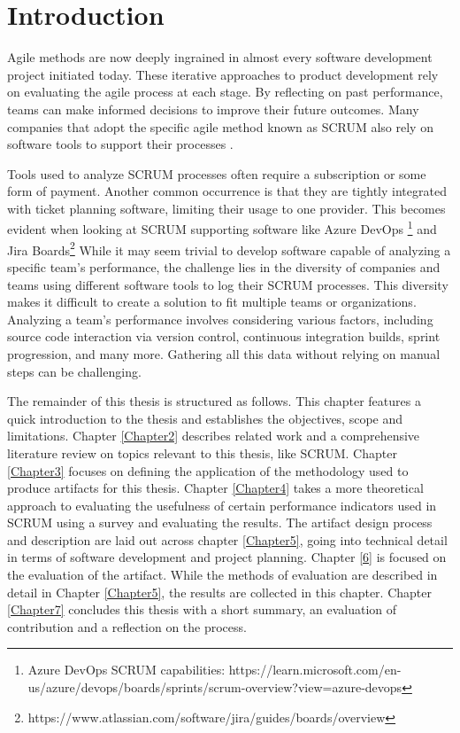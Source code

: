 \chapter{Introduction}
\label{Chapter1}

Agile methods are now deeply ingrained in almost every software development project initiated today.
These iterative approaches to product development rely on evaluating the agile 
process at each stage. By reflecting on past performance, 
teams can make informed decisions to improve their future outcomes. 
Many companies that adopt the specific agile method known as SCRUM also 
rely on software tools to support their processes \parencite{Katsma2013Can}.

Tools used to analyze SCRUM processes often require 
a subscription or some form of payment. 
Another common occurrence is that they are tightly integrated with ticket planning software, 
limiting their usage to one provider. 
This becomes evident when looking at SCRUM supporting software like Azure DevOps
\footnote{Azure DevOps SCRUM capabilities: https://learn.microsoft.com/en-us/azure/devops/boards/sprints/scrum-overview?view=azure-devops}
and Jira Boards\footnote{https://www.atlassian.com/software/jira/guides/boards/overview}
While it may seem trivial to develop software capable of analyzing a specific 
team's performance, the challenge lies in the diversity of companies and teams 
using different software tools to log their SCRUM processes. 
This diversity makes it difficult to create a solution to fit multiple teams or organizations. 
Analyzing a team's performance involves considering various factors, 
including source code interaction via version control, continuous integration builds, 
sprint progression, and many more. 
Gathering all this data without relying on manual steps can be challenging.

The remainder of this thesis is structured as follows. 
This chapter features a quick introduction to the thesis and 
establishes the objectives, scope and limitations. 
Chapter \ref{Chapter2} describes related work and a comprehensive 
literature review on topics relevant to this thesis, like SCRUM. 
Chapter \ref{Chapter3} focuses on defining the application of the 
methodology used to produce artifacts for this thesis. 
Chapter \ref{Chapter4} takes a more theoretical approach to evaluating 
the usefulness of certain performance indicators used in SCRUM using a 
survey and evaluating the results. 
The artifact design process and description are laid out across chapter \ref{Chapter5}, 
going into technical detail in terms of software development and project planning. 
Chapter \ref{6} is focused on the evaluation of the artifact. 
While the methods of evaluation are described in detail in Chapter \ref{Chapter5}, 
the results are collected in this chapter. 
Chapter \ref{Chapter7} concludes this thesis with a short summary, 
an evaluation of contribution and a reflection on the process.
 
